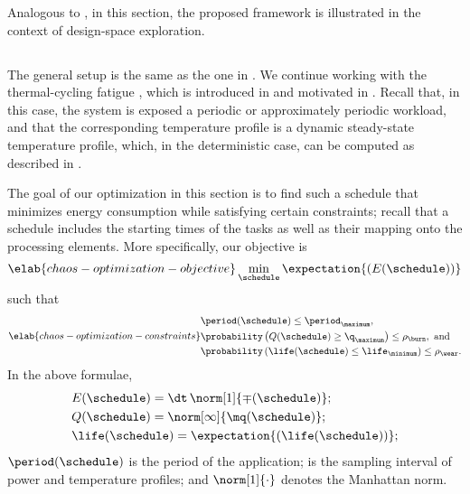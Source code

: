 Analogous to , in this section, the proposed framework
is illustrated in the context of design-space exploration.

\subsection{\problemtitle}

The general setup is the same as the one in .
We continue working with the thermal-cycling fatigue \cite{jedec2016}, which is
introduced in  and motivated in
. Recall that, in this case, the system is exposed a
periodic or approximately periodic workload, and that the corresponding
temperature profile is a dynamic steady-state temperature profile, which, in the
deterministic case, can be computed as described in
.

The goal of our optimization in this section is to find such a schedule
\schedule that minimizes energy consumption while satisfying certain
constraints; recall that a schedule includes the starting times of the tasks as
well as their mapping onto the processing elements. More specifically, our
objective is
\begin{equation} \elab{chaos-optimization-objective}
  \min_{\schedule} \expectation{(E(\schedule))}
\end{equation}
such that
\begin{equation} \elab{chaos-optimization-constraints}
  \begin{split}
    & \period(\schedule) \leq \period_\maximum, \\
    & \probability\left(Q(\schedule) \geq \q_\maximum\right) \leq \rho_\burn, \text{ and} \\
    & \probability\left(\life(\schedule) \leq \life_\minimum\right) \leq \rho_\wear.
  \end{split}
\end{equation}
In the above formulae,
\begin{align*}
  & E(\schedule) = \dt \, \norm[1]{\mp(\schedule)}; \\
  & Q(\schedule) = \norm[\infty]{\mq(\schedule)}; \\
  & \life(\schedule) = \expectation{\left(\life(\schedule)\right)};
\end{align*}
$\period(\schedule)$ is the period of the application; \dt is the sampling
interval of power and temperature profiles; and $\norm[1]{\cdot}$ denotes the
Manhattan norm.

